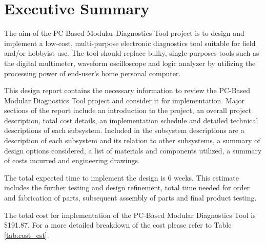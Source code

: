 \section*{Executive Summary}
The aim of the PC-Based Modular Diagnostics Tool project is to design and implement
a low-cost, multi-purpose electronic diagnostics tool suitable for field and/or
hobbyist use. The tool should replace bulky, single-purposes tools such as the digital 
multimeter, waveform oscilloscope and logic analyzer by utilizing the processing
power of end-user's home personal computer.

This design report contains the necessary information to review the PC-Based Modular 
Diagnostics Tool project and consider it for implementation. Major sections of the
report include an introduction to the project, an overall project description,
total cost details, an implementation schedule and detailed technical descriptions of each
subsystem. Included in the subsystem descriptions are a description of each subsystem
and its relation to other subsystems, a summary of design options considered, a list 
of materials and components utilized, a summary of costs incurred and engineering drawings.

The total expected time to implement the design is 6 weeks. This estimate includes the 
further testing and design refinement, total time needed for order and fabrication of parts, 
subsequent assembly of parts and final product testing.

The total cost for implementation of the PC-Based Modular Diagnostics Tool is \$191.87. For a more detailed breakdown of the cost please refer to Table \ref{tab:cost_est}.


